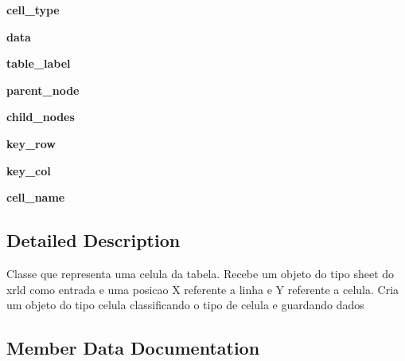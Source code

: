 \begin{DoxyCompactItemize}
{\bfseries cell\+\_\+type}
\item 
\mbox{\label{class_tabela_1_1_cell_aae4fd1ac2cefbce827ff7713e6db3a52}} 
{\bfseries data}
\item 
\mbox{\label{class_tabela_1_1_cell_adc1415ea59c977255d5d5c9ee0235453}} 
{\bfseries table\+\_\+label}
\item 
\mbox{\label{class_tabela_1_1_cell_ac37f9319e055d0ca765ba3c77d68252c}} 
{\bfseries parent\+\_\+node}
\item 
\mbox{\label{class_tabela_1_1_cell_a6c52a49677bbce958aa0b7c037892942}} 
{\bfseries child\+\_\+nodes}
\item 
\mbox{\label{class_tabela_1_1_cell_a9086096bb2d966a75e18722fcb2659d1}} 
{\bfseries key\+\_\+row}
\item 
\mbox{\label{class_tabela_1_1_cell_a9d9b117373e9ddef7a2ad8832d4da842}} 
{\bfseries key\+\_\+col}
\item 
\mbox{\label{class_tabela_1_1_cell_a54bfaf35d099a9c6bd88a032618a2528}} 
{\bfseries cell\+\_\+name}
\end{DoxyCompactItemize}


\subsection{Detailed Description}
\begin{DoxyVerb}Classe que representa uma celula da tabela. Recebe um objeto do tipo sheet do xrld como entrada
    e uma posicao X referente a linha e Y referente a celula. Cria um objeto do tipo celula classificando o tipo de celula e guardando dados\end{DoxyVerb}
 

\subsection{Member Data Documentation}
\mbox{\label{class_tabela_1_1_cell_a81d6743175d93342642a052894df99a2}} 

